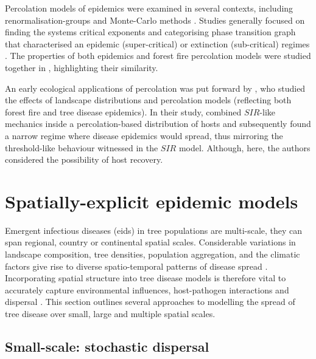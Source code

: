 Percolation models of epidemics were examined in several contexts,
including renormalisation-groups \cite{pub.1060474189} and Monte-Carlo methods \cite{pub.1059069981}. 
Studies generally focused on finding the systems critical exponents and categorising phase
transition graph that characterised an epidemic (super-critical) or extinction (sub-critical) 
regimes \cite{GRASSBERGER1986273}. The properties of both epidemics and forest fire percolation 
models were studied together in \cite{pub.1052857560}, highlighting their similarity.

An early ecological applications of percolation was put forward by \cite{pub.1031591030}, 
who studied the effects of landscape distributions and percolation models 
(reflecting both forest fire and tree disease epidemics). In their study, \cite{pub.1031591030} 
combined $SIR$-like mechanics inside a percolation-based distribution of hosts and subsequently 
found a narrow regime where disease epidemics would spread, thus mirroring the threshold-like 
behaviour witnessed in the $SIR$ model. Although, here, the authors considered the possibility of host recovery.
\newpage

\section{Spatially-explicit epidemic models}
\label{ch2:lit-rev-compartmentalised-models}

Emergent infectious diseases (\acrshort{eid}s) in tree populations are multi-scale,
they can span regional, country or continental spatial scales. Considerable variations in landscape composition,
tree densities, population aggregation, and the climatic factors give rise to diverse spatio-temporal
patterns of disease spread \cite{he2019integrating, suzuki2003spatial}. Incorporating spatial structure
into tree disease models is therefore vital to accurately capture environmental influences, host-pathogen 
interactions and dispersal \cite{liu2007characterizing}. This section outlines several approaches to modelling
the spread of tree disease over small, large and multiple spatial scales.

\subsection{Small-scale: stochastic dispersal}
\label{ch2:dispersal}

